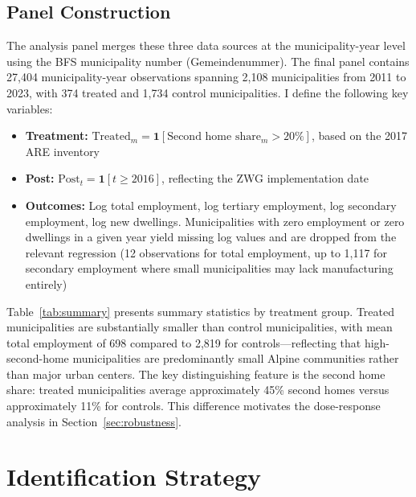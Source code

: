 \documentclass[12pt]{article}
\begin{document}
\subsection{Panel Construction}

The analysis panel merges these three data sources at the municipality-year level using the BFS municipality number (Gemeindenummer). The final panel contains 27,404 municipality-year observations spanning 2,108 municipalities from 2011 to 2023, with 374 treated and 1,734 control municipalities. I define the following key variables:

\begin{itemize}
  \item \textbf{Treatment:} $\text{Treated}_m = \mathbf{1}[\text{Second home share}_m > 20\%]$, based on the 2017 ARE inventory
  \item \textbf{Post:} $\text{Post}_t = \mathbf{1}[t \geq 2016]$, reflecting the ZWG implementation date
  \item \textbf{Outcomes:} Log total employment, log tertiary employment, log secondary employment, log new dwellings. Municipalities with zero employment or zero dwellings in a given year yield missing log values and are dropped from the relevant regression (12 observations for total employment, up to 1,117 for secondary employment where small municipalities may lack manufacturing entirely)
\end{itemize}

Table~\ref{tab:summary} presents summary statistics by treatment group. Treated municipalities are substantially smaller than control municipalities, with mean total employment of 698 compared to 2,819 for controls---reflecting that high-second-home municipalities are predominantly small Alpine communities rather than major urban centers. The key distinguishing feature is the second home share: treated municipalities average approximately 45\% second homes versus approximately 11\% for controls. This difference motivates the dose-response analysis in Section~\ref{sec:robustness}.



\section{Identification Strategy}\label{sec:design}
\end{document}

